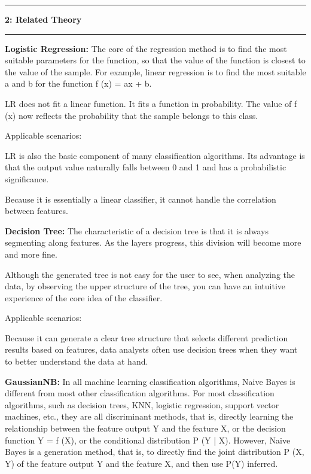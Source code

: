 \documentclass[11pt]{article}
\newcommand\question[2]{\vspace{.25in}\hrule\textbf{#1: #2}\vspace{.5em}\hrule\vspace{.10in}}
\begin{document}
\question{2}{Related Theory}
\vspace{.10in}\textbf{Logistic Regression:}
The core of the regression method is to find the most suitable parameters for the function, so that the value of the function is closest to the value of the sample. 
For example, linear regression is to find the most suitable a and b for the function f (x) = ax + b.

LR does not fit a linear function. It fits a function in probability. The value of f (x) now reflects the probability that the sample belongs to this class.

Applicable scenarios:

LR is also the basic component of many classification algorithms. Its advantage is that the output value naturally falls between 0 and 1 and has a probabilistic significance.

Because it is essentially a linear classifier, it cannot handle the correlation between features.

\vspace{.10in}\textbf{Decision Tree:}
The characteristic of a decision tree is that it is always segmenting along features. 
As the layers progress, this division will become more and more fine.

Although the generated tree is not easy for the user to see, when analyzing the data, by observing the upper structure of the tree, you can have an intuitive experience of the core idea of ​​the classifier.

Applicable scenarios:

Because it can generate a clear tree structure that selects different prediction results based on features, data analysts often use decision trees when they want to better understand the data at hand.

\vspace{.10in}\textbf{GaussianNB:}
In all machine learning classification algorithms, Naive Bayes is different from most other classification algorithms. 
For most classification algorithms, such as decision trees, KNN, logistic regression, support vector machines, etc., they are all discriminant methods, that is, directly learning the relationship between the feature output Y and the feature X, or the decision function Y = f 
(X), or the conditional distribution P (Y | X). 
However, Naive Bayes is a generation method, that is, to directly find the joint distribution P (X, Y) of the feature output Y and the feature X, and then use P(Y) inferred.
\end{document}
